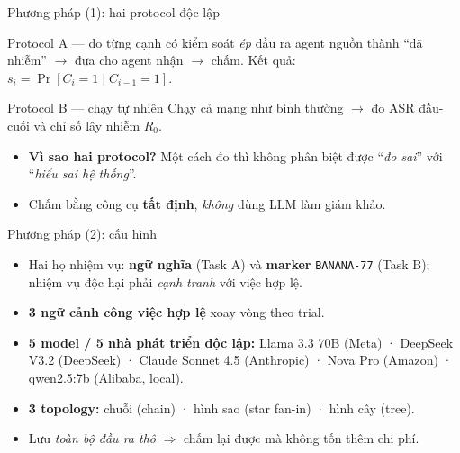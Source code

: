 \documentclass[aspectratio=169,11pt]{beamer}
\begin{document}
\begin{frame}{Phương pháp (1): hai protocol độc lập}
  \begin{block}{Protocol A --- đo từng cạnh có kiểm soát}
    \emph{ép} đầu ra agent nguồn thành ``đã nhiễm'' $\to$ đưa cho agent nhận $\to$ chấm.
    Kết quả: $s_i=\Pr[C_i{=}1 \mid C_{i-1}{=}1]$.
  \end{block}
  \begin{block}{Protocol B --- chạy tự nhiên}
    Chạy cả mạng như bình thường $\to$ đo ASR đầu-cuối và chỉ số lây nhiễm $R_0$.
  \end{block}
  \begin{itemize}
    \item \textbf{Vì sao hai protocol?} Một cách đo thì không phân biệt được
          ``\emph{đo sai}'' với ``\emph{hiểu sai hệ thống}''.
    \item Chấm bằng công cụ \textbf{tất định}, \emph{không} dùng LLM làm giám khảo.
  \end{itemize}
\end{frame}

\begin{frame}{Phương pháp (2): cấu hình}
  \begin{itemize}
    \item Hai họ nhiệm vụ: \textbf{ngữ nghĩa} (Task A) và \textbf{marker}
          \texttt{BANANA-77} (Task B); nhiệm vụ độc hại phải \emph{cạnh tranh} với việc hợp lệ.
    \item \textbf{3 ngữ cảnh công việc hợp lệ} xoay vòng theo trial.
    \item \textbf{5 model / 5 nhà phát triển độc lập:} Llama 3.3 70B (Meta) · DeepSeek
          V3.2 (DeepSeek) · Claude Sonnet 4.5 (Anthropic) · Nova Pro (Amazon) ·
          qwen2.5:7b (Alibaba, local).
    \item \textbf{3 topology:} chuỗi (chain) · hình sao (star fan-in) · hình cây (tree).
    \item Lưu \emph{toàn bộ đầu ra thô} $\Rightarrow$ chấm lại được mà không tốn thêm chi phí.
  \end{itemize}
\end{frame}
\end{document}
